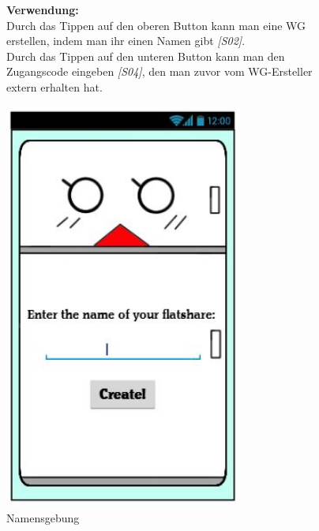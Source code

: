 \documentclass[a4paper]{scrreprt}
\begin{document}
\begin{figure}[h]
\begin{minipage}[b]{0.55\linewidth}
        		\hfill
        		
        		\textbf{Verwendung:}\\
        		Durch das Tippen auf den oberen Button
        		kann man eine WG erstellen, indem man ihr
        		einen Namen gibt \textit{{[}S02{]}}.\\
        		Durch das Tippen auf den unteren Button kann
        		man den Zugangscode eingeben \textit{{[}S04{]}}, den man zuvor vom WG-Ersteller extern erhalten 
        		hat.
        		
        	\end{minipage}
        \end{figure}
    
    	\begin{figure}[h!]
    		\begin{minipage}[t]{0.4\linewidth}
    			\flushright
    			\centering
    			\vspace{9mm}
    			\includegraphics[width=0.7\textwidth]{fridget_nameenter.JPG}
    			\caption{Namensgebung}
    			\label{fig:figure1}
    		\end{minipage}
    		\hspace{0.5cm}

\end{figure}
\end{document}
